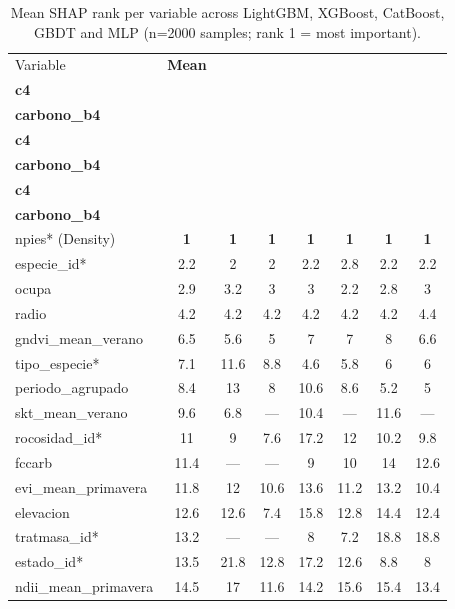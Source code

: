\begin{table}[htbp]
  \centering
  \footnotesize
  \caption{Mean SHAP rank per variable across LightGBM, XGBoost, CatBoost, GBDT and MLP (n=2000 samples; rank 1 = most important).}
  \label{tab:shap_rank_abs}
  \begin{tabular}{lccccccc}
    \toprule
    Variable & \textbf{Mean} & \makecell{\textbf{IFN2} \\ \textbf{c4}} & \makecell{\textbf{IFN2} \\ \textbf{carbono\_b4}} & \makecell{\textbf{IFN3} \\ \textbf{c4}} & \makecell{\textbf{IFN3} \\ \textbf{carbono\_b4}} & \makecell{\textbf{IFN2+3} \\ \textbf{c4}} & \makecell{\textbf{IFN2+3} \\ \textbf{carbono\_b4}} \\
    \midrule
    npies* (Density) & \textbf{1} & \textbf{1} & \textbf{1} & \textbf{1} & \textbf{1} & \textbf{1} & \textbf{1} \\
    especie\_id* & 2.2 & 2 & 2 & 2.2 & 2.8 & 2.2 & 2.2 \\
    ocupa & 2.9 & 3.2 & 3 & 3 & 2.2 & 2.8 & 3 \\
    radio & 4.2 & 4.2 & 4.2 & 4.2 & 4.2 & 4.2 & 4.4 \\
    gndvi\_mean\_verano & 6.5 & 5.6 & 5 & 7 & 7 & 8 & 6.6 \\
    tipo\_especie* & 7.1 & 11.6 & 8.8 & 4.6 & 5.8 & 6 & 6 \\
    periodo\_agrupado & 8.4 & 13 & 8 & 10.6 & 8.6 & 5.2 & 5 \\
    skt\_mean\_verano & 9.6 & 6.8 & --- & 10.4 & --- & 11.6 & --- \\
    rocosidad\_id* & 11 & 9 & 7.6 & 17.2 & 12 & 10.2 & 9.8 \\
    fccarb & 11.4 & --- & --- & 9 & 10 & 14 & 12.6 \\
    evi\_mean\_primavera & 11.8 & 12 & 10.6 & 13.6 & 11.2 & 13.2 & 10.4 \\
    elevacion & 12.6 & 12.6 & 7.4 & 15.8 & 12.8 & 14.4 & 12.4 \\
    tratmasa\_id* & 13.2 & --- & --- & 8 & 7.2 & 18.8 & 18.8 \\
    estado\_id* & 13.5 & 21.8 & 12.8 & 17.2 & 12.6 & 8.8 & 8 \\
    ndii\_mean\_primavera & 14.5 & 17 & 11.6 & 14.2 & 15.6 & 15.4 & 13.4 \\

\end{tabular}
\end{table}
